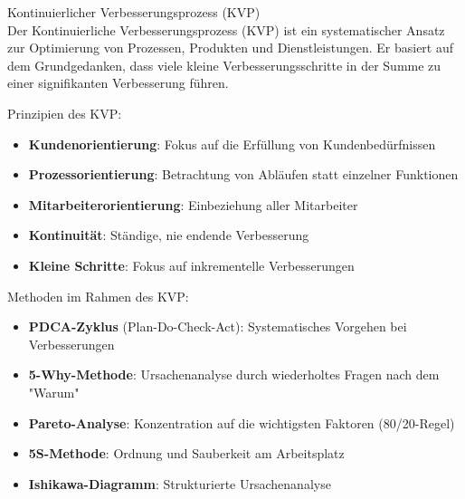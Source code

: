 \begin{concept}{Kontinuierlicher Verbesserungsprozess (KVP)}\\
Der Kontinuierliche Verbesserungsprozess (KVP) ist ein systematischer Ansatz zur Optimierung von Prozessen, Produkten und Dienstleistungen. Er basiert auf dem Grundgedanken, dass viele kleine Verbesserungsschritte in der Summe zu einer signifikanten Verbesserung führen.

Prinzipien des KVP:
\begin{itemize}
    \item \textbf{Kundenorientierung}: Fokus auf die Erfüllung von Kundenbedürfnissen
    \item \textbf{Prozessorientierung}: Betrachtung von Abläufen statt einzelner Funktionen
    \item \textbf{Mitarbeiterorientierung}: Einbeziehung aller Mitarbeiter
    \item \textbf{Kontinuität}: Ständige, nie endende Verbesserung
    \item \textbf{Kleine Schritte}: Fokus auf inkrementelle Verbesserungen
\end{itemize}

Methoden im Rahmen des KVP:
\begin{itemize}
    \item \textbf{PDCA-Zyklus} (Plan-Do-Check-Act): Systematisches Vorgehen bei Verbesserungen
    \item \textbf{5-Why-Methode}: Ursachenanalyse durch wiederholtes Fragen nach dem "Warum"
    \item \textbf{Pareto-Analyse}: Konzentration auf die wichtigsten Faktoren (80/20-Regel)
    \item \textbf{5S-Methode}: Ordnung und Sauberkeit am Arbeitsplatz
    \item \textbf{Ishikawa-Diagramm}: Strukturierte Ursachenanalyse
\end{itemize}
\end{concept}

